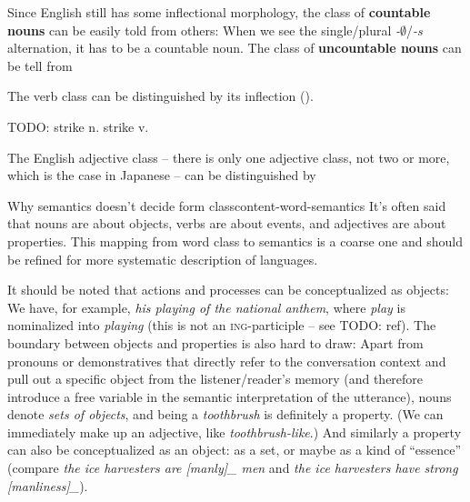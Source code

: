 \documentclass[UTF8, a4paper, oneside, scheme=plain]{ctexrep}
\newcommand*{\concept}[1]{\textbf{#1}}
\newcommand{\corpus}[1]{\emph{#1}}
\newcommand{\corpuscat}[1]{\textsc{#1}}
\newcommand{\emptymorpheme}{$\emptyset$}
\begin{document}
Since English still has some inflectional morphology,
the class of \concept{countable nouns} can be easily told from others:
When we see the single/plural \corpus{-\emptymorpheme}/\corpus{-s} alternation, it has to be a countable noun.
The class of \concept{uncountable nouns} can be tell from 

The verb class can be distinguished by its inflection (). 

TODO: strike n. strike v.

The English adjective class -- there is only one adjective class, not two or more,
which is the case in Japanese -- 
can be distinguished by 

\begin{theorybox}{Why semantics doesn't decide form class}{content-word-semantics}
    It's often said that nouns are about objects, 
    verbs are about events,
    and adjectives are about properties.
    This mapping from word class to semantics is a coarse one 
    and should be refined for more systematic description of languages.

    It should be noted that actions and processes can be conceptualized as objects:
    We have, for example, \corpus{his playing of the national anthem},
    where \corpus{play} is nominalized into \corpus{playing}
    (this is not an \corpuscat{ing}-participle -- see TODO: ref).
    The boundary between objects and properties is also hard to draw:
    Apart from pronouns or demonstratives 
    that directly refer to the conversation context 
    and pull out a specific object from the listener/reader's memory
    (and therefore introduce a free variable in the semantic interpretation of the utterance),
    nouns denote \emph{sets of objects},
    and being a \corpus{toothbrush} is definitely a property.
    (We can immediately make up an adjective, like \corpus{toothbrush-like}.)
    And similarly a property can also be conceptualized as an object: 
    as a set, or maybe as a kind of ``essence''
    (compare \corpus{the ice harvesters are [manly]_{} men}
    and \corpus{the ice harvesters have strong [manliness]_{\text{object?}}}).


\end{theorybox}
\end{document}
